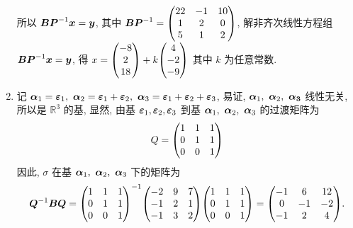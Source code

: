 \begin{solution}
\begin{enumerate}[label=(\arabic{*})]
              所以 $\vb*{BP}^{-1}\vb*{x}=\vb*{y}$, 其中 $\vb*{BP}^{-1}=\mqty(22&-1&10\\1&2&0\\5&1&2)$, 解非齐次线性方程组 $\vb*{BP}^{-1}\vb*{x}=\vb*{y}$, 得 $x=\mqty(-8\\2\\18)+k\mqty(4\\-2\\-9)$ 其中 $k$ 为任意常数.
        \item 记 $\vb*{\alpha}_1=\vb*{\varepsilon}_1,~\vb*{\alpha}_2=\vb*{\varepsilon}_1+\vb*{\varepsilon}_2,~\vb*{\alpha}_3=\vb*{\varepsilon}_1+\vb*{\varepsilon}_2+\vb*{\varepsilon}_3$, 易证, $\vb*{\alpha}_1,~\vb*{\alpha}_2,~\vb*{\alpha_3}$ 线性无关, 所以是 $\mathbb{R}^3$ 的基, 
              显然, 由基 $\vb*{\varepsilon}_1,\vb*{\varepsilon}_2,\vb*{\varepsilon}_3$ 到基 $\vb*{\alpha}_1,~\vb*{\alpha}_2,~\vb*{\alpha}_3$ 的过渡矩阵为 $$Q=\mqty(1&1&1\\0&1&1\\0&0&1)$$
              因此, $\sigma$ 在基 $\vb*{\alpha}_1,~\vb*{\alpha}_2,~\vb*{\alpha}_3$ 下的矩阵为
              $$\vb*{Q}^{-1}\vb*{BQ}=\mqty(1&1&1\\0&1&1\\0&0&1)^{-1}\mqty(-2&9&7\\-1&2&1\\-1&3&2)\mqty(1&1&1\\0&1&1\\0&0&1)=\mqty(-1&6&12\\0&-1&-2\\-1&2&4).$$
    \end{enumerate}
\end{solution}
